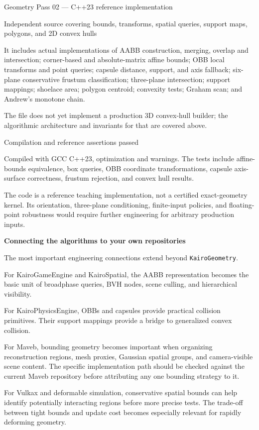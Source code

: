Geometry Pass 02 --- C++23 reference implementation

Independent source covering bounds, transforms, spatial queries, support maps, polygons, and 2D convex hulls

It includes actual implementations of AABB construction, merging, overlap and intersection; corner-based and absolute-matrix affine bounds; OBB local transforms and point queries; capsule distance, support, and axis fallback; six-plane conservative frustum classification; three-plane intersection; support mappings; shoelace area; polygon centroid; convexity tests; Graham scan; and Andrew's monotone chain.

The file does not yet implement a production 3D convex-hull builder; the algorithmic architecture and invariants for that are covered above.

Compilation and reference assertions passed

Compiled with GCC C++23, optimization and warnings. The tests include affine-bounds equivalence, box queries, OBB coordinate transformations, capsule axis-surface correctness, frustum rejection, and convex hull results.

The code is a reference teaching implementation, not a certified exact-geometry kernel. Its orientation, three-plane conditioning, finite-input policies, and floating-point robustness would require further engineering for arbitrary production inputs.

\textbf{Connecting the algorithms to your own repositories}

The most important engineering connections extend beyond \texttt{KairoGeometry}.

For KairoGameEngine and KairoSpatial, the AABB representation becomes the basic unit of broadphase queries, BVH nodes, scene culling, and hierarchical visibility.

For KairoPhysicsEngine, OBBs and capsules provide practical collision primitives. Their support mappings provide a bridge to generalized convex collision.

For Maveb, bounding geometry becomes important when organizing reconstruction regions, mesh proxies, Gaussian spatial groups, and camera-visible scene content. The specific implementation path should be checked against the current Maveb repository before attributing any one bounding strategy to it.

For Vulkax and deformable simulation, conservative spatial bounds can help identify potentially interacting regions before more precise tests. The trade-off between tight bounds and update cost becomes especially relevant for rapidly deforming geometry.

